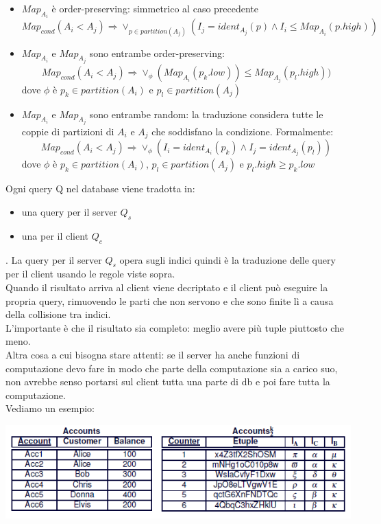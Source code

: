 \begin{itemize}
\begin{itemize}
        \item \(Map_{A_i}\) è order-preserving: simmetrico al caso precedente
        \[ Map_{cond}(A_i < A_j) \Longrightarrow \lor_{p \in partition(A_j)} (I_j=ident_{A_j}(p) \land I_i \leq Map_{A_i}(p.high)) \]
        
        \item  \(Map_{A_i}\) e \(Map_{A_j}\) sono entrambe order-preserving:
        \[ Map_{cond}(A_i < A_j) \Longrightarrow \lor_\phi (Map_{A_i}(p_k.low)) \leq Map_{A_j}(p_l.high)) \]
        dove \(\phi\) è \(p_k \in partition(A_i)\) e \(p_l \in partition(A_j)\)
        
        \item \(Map_{A_i}\) e \(Map_{A_j}\) sono entrambe random: la traduzione considera tutte le coppie di partizioni di \(A_i\) e \(A_j\) che soddisfano la condizione. Formalmente:
        \[ Map_{cond}(A_i < A_j) \Longrightarrow \lor_\phi  (I_i = ident_{A_i}(p_k) \land I_j = ident_{A_j}(p_l)) \]
        dove \(\phi\) è \(p_k \in partition(A_i)\), \(p_l \in partition(A_j)\) e \(p_l.high \geq p_k.low\)
        
    \end{itemize}
\end{itemize}
Ogni query Q nel database viene tradotta in:
\begin{itemize}
    \item una query per il server \(Q_s\) 
    \item una per il client \(Q_c\) 
\end{itemize}. 
La query per il server \(Q_s\) opera sugli indici quindi è la traduzione delle query per il client usando le regole viste sopra. \\
Quando il risultato arriva al client viene decriptato e il client può eseguire la propria query, rimuovendo le parti che non servono e che sono finite lì a causa della collisione tra indici. \\
L’importante è che il risultato sia completo: meglio avere più tuple piuttosto che meno. \\
Altra cosa a cui bisogna stare attenti: se il server ha anche funzioni di computazione devo fare in modo che parte della computazione sia a carico suo, non avrebbe senso portarsi sul client tutta una parte di db e poi fare tutta la computazione.\\
Vediamo un esempio:
\begin{center}
    \includegraphics[scale=0.6]{img/querytrans.png}
\end{center}
